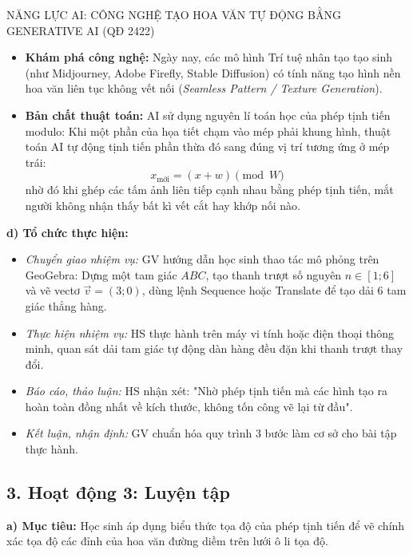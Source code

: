 \documentclass[12pt, a4paper]{article}
\renewcommand{\vec}[1]{\overrightarrow{#1}}
\begin{document}
\begin{aibox}{NĂNG LỰC AI: CÔNG NGHỆ TẠO HOA VĂN TỰ ĐỘNG BẰNG GENERATIVE AI (QĐ 2422)}  
\begin{itemize}[leftmargin=0.6cm]  
    \item \textbf{Khám phá công nghệ:} Ngày nay, các mô hình Trí tuệ nhân tạo tạo sinh (như Midjourney, Adobe Firefly, Stable Diffusion) có tính năng tạo hình nền hoa văn liên tục không vết nối (\textit{Seamless Pattern / Texture Generation}).  
    \item \textbf{Bản chất thuật toán:} AI sử dụng nguyên lí toán học của phép tịnh tiến modulo: Khi một phần của họa tiết chạm vào mép phải khung hình, thuật toán AI tự động tịnh tiến phần thừa đó sang đúng vị trí tương ứng ở mép trái:  
    $$x_{\text{mới}} = (x + w) \pmod W$$  
    nhờ đó khi ghép các tấm ảnh liên tiếp cạnh nhau bằng phép tịnh tiến, mắt người không nhận thấy bất kì vết cắt hay khớp nối nào.  
\end{itemize}  
\end{aibox}  
  
\noindent \textbf{d) Tổ chức thực hiện:}  
\begin{itemize}[leftmargin=0.8cm]  
    \item \textit{Chuyển giao nhiệm vụ:} GV hướng dẫn học sinh thao tác mô phỏng trên GeoGebra: Dựng một tam giác $ABC$, tạo thanh trượt số nguyên $n \in [1; 6]$ và vẽ vectơ $\vec{v} = (3; 0)$, dùng lệnh Sequence hoặc Translate để tạo dải 6 tam giác thẳng hàng.  
    \item \textit{Thực hiện nhiệm vụ:} HS thực hành trên máy vi tính hoặc điện thoại thông minh, quan sát dải tam giác tự động dàn hàng đều đặn khi thanh trượt thay đổi.  
    \item \textit{Báo cáo, thảo luận:} HS nhận xét: "Nhờ phép tịnh tiến mà các hình tạo ra hoàn toàn đồng nhất về kích thước, không tốn công vẽ lại từ đầu".  
    \item \textit{Kết luận, nhận định:} GV chuẩn hóa quy trình 3 bước làm cơ sở cho bài tập thực hành.  
\end{itemize}  
  
\subsection*{3. Hoạt động 3: Luyện tập}  
  
\noindent \textbf{a) Mục tiêu:}  
Học sinh áp dụng biểu thức tọa độ của phép tịnh tiến để vẽ chính xác tọa độ các đỉnh của hoa văn đường diềm trên lưới ô li tọa độ.  
  
\end{document}
